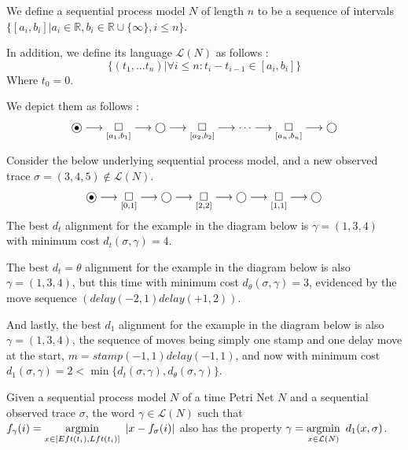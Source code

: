 \documentclass[runningheads]{llncs}
\newcommand\eye{\ensurestackMath{\stackinset{c}{}{c}{-.33pt}%
		{\bullet}{\bigcirc}}}
\DeclareMathOperator*{\argmin}{argmin}
\begin{document}
\begin{definition}
We define a sequential process model $N$ of length $n$ to be a sequence of intervals $\{[a_i, b_i] | a_i \in \mathbb{R}, b_i \in \mathbb{R} \cup \{\infty\}, i \leq n\}$. 

In addition, we define its language $\mathcal{L}(N)$ as follows : $$\{(t_1, \dots t_n) | \forall i \leq n : t_i - t_{i-1} \in [a_i, b_i]\}$$ Where $t_0 = 0$. 

We depict them as follows : 
$$\eye \longrightarrow \underset{[a_1, b_1]}{\square} \longrightarrow \bigcirc \longrightarrow \underset{[a_2,b_2]}{\square} \longrightarrow \dots \longrightarrow \underset{[a_n, b_n]}{\square} \longrightarrow \bigcirc$$
\end{definition}

\begin{example}\label{mixedmoveex}
Consider the below underlying sequential process model, and a new observed trace $\sigma = (3, 4, 5) \not \in \mathcal{L}(N)$. 
$$\eye \longrightarrow \underset{[0,1]}{\square} \longrightarrow \bigcirc \longrightarrow \underset{[2,2]}{\square} \longrightarrow \bigcirc \longrightarrow \underset{[1,1]}{\square} \longrightarrow \bigcirc$$
The best $d_t$ alignment for the example in the diagram below is $\gamma = (1,3,4)$ with minimum cost $d_t(\sigma, \gamma) = 4$. 

The best $d_t=\theta$ alignment for the example in the diagram below is also $\gamma = (1,3,4)$, but this time with minimum cost $d_\theta(\sigma, \gamma) = 3$, evidenced by the move sequence $(delay(-2, 1)delay(+1, 2))$. 

And lastly, the best $d_1$ alignment for the example in the diagram below is also $\gamma = (1,3,4)$, the sequence of moves being simply one stamp and one delay move at the start, $m = stamp(-1, 1)delay(-1, 1)$, and now with minimum cost $d_1(\sigma, \gamma) = 2 < \min \{d_t(\sigma, \gamma), d_\theta(\sigma, \gamma)\}$. 
\end{example}

\begin{theorem}\label{MixAlign} Given a sequential process model $N$ of a time Petri Net $N$ and a sequential observed trace $\sigma$, the word $\gamma \in \mathcal{L}(N)$ such that $f_{\gamma}(i)= \underset{x \in [Eft(t_i), Lft(t_i)]} {\argmin}\hspace{0.5em} {|x - f_\sigma(i)|}$ also has the property $\gamma = \underset{x \in \mathcal{L}(N)}{\argmin} \hspace{0.5em}{d_1(x, \sigma)}$. 
\end{theorem}
\end{document}
